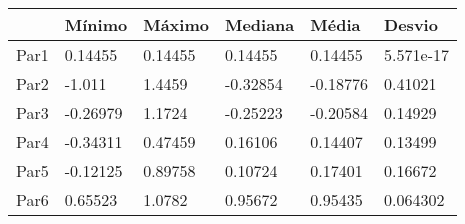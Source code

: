 \begin{tabular}{llllll}
& Mínimo & Máximo & Mediana & Média & Desvio \\ 
\hline 
Par1 & 0.14455 & 0.14455 & 0.14455 & 0.14455 & 5.571e-17 \\ 
Par2 & -1.011 & 1.4459 & -0.32854 & -0.18776 & 0.41021 \\ 
Par3 & -0.26979 & 1.1724 & -0.25223 & -0.20584 & 0.14929 \\ 
Par4 & -0.34311 & 0.47459 & 0.16106 & 0.14407 & 0.13499 \\ 
Par5 & -0.12125 & 0.89758 & 0.10724 & 0.17401 & 0.16672 \\ 
Par6 & 0.65523 & 1.0782 & 0.95672 & 0.95435 & 0.064302 \\ 
\hline 
\end{tabular}